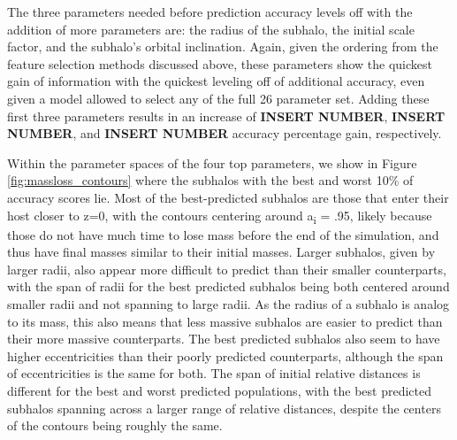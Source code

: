 \documentclass[fleqn,usenatbib]{mnras}
\begin{document}
The three parameters needed before prediction accuracy levels off with the addition of more parameters are: the radius of the subhalo, the initial scale factor, and the subhalo's orbital inclination. Again, given the ordering from the feature selection methods discussed above, these parameters show the quickest gain of information with the quickest leveling off of additional accuracy, even given a model allowed to select any of the full 26 parameter set. Adding these first three parameters results in an increase of \textbf{INSERT NUMBER}, \textbf{INSERT NUMBER}, and  \textbf{INSERT NUMBER} accuracy percentage gain, respectively. 

Within the parameter spaces of the four top parameters, we show in Figure \ref{fig:massloss_contours} where the subhalos with the best and worst 10\% of accuracy scores lie. Most of the best-predicted subhalos are those that enter their host closer to z=0, with the contours centering around a\textsubscript{i} = .95, likely because those do not have much time to lose mass before the end of the simulation, and thus have final masses similar to their initial masses. Larger subhalos, given by larger radii, also appear more difficult to predict than their smaller counterparts, with the span of radii for the best predicted subhalos being both centered around smaller radii and not spanning to large radii. As the radius of a subhalo is analog to its mass, this also means that less massive subhalos are easier to predict than their more massive counterparts. The best predicted subhalos also seem to have higher eccentricities than their poorly predicted counterparts, although the span of eccentricities is the same for both. The span of initial relative distances is different for the best and worst predicted populations, with the best predicted subhalos spanning across a larger range of relative distances, despite the centers of the contours being roughly the same.
\end{document}

